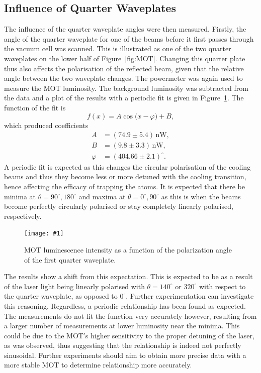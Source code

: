 \documentclass[twocolumn]{article}
\newcommand{\insertFigure}[1]{%
   \texttt{[image: \#1]}%
}
\begin{document}
\subsection{Influence of Quarter Waveplates}
The influence of the quarter waveplate angles were then measured. Firstly, the angle of the quarter waveplate for one of the beams before it first passes through the vacuum cell was scanned. This is illustrated as one of the two quarter waveplates on the lower half of Figure~\ref{fig:MOT}. Changing this quarter plate thus also affects the polarisation of the reflected beam, given that the relative angle between the two waveplate changes. The powermeter was again used to measure the MOT luminosity. The background luminosity was subtracted from the data and a plot of the results with a periodic fit is given in Figure~\ref{fig:Waveplate}. The function of the fit is
\begin{equation}
f(x) = A \cos\big(x - \varphi \big) + B, \nonumber
\end{equation}
which produced coefficients
\begin{align*}
A &=  (74.9 \pm 5.4) \, \text{nW},\\
B &=  (9.8 \pm 3.3) \, \text{nW},\\
\varphi &=  (404.66 \pm 2.1)^\circ.
\end{align*}
A periodic fit is expected as this changes the circular polarisation of the cooling beams and thus they become less or more detuned with the cooling transition, hence affecting the efficacy of trapping the atoms. It is expected that there be minima at $\theta=90^\circ, 180^\circ$ and maxima at $\theta=0^\circ, 90^\circ$ as this is when the beams become perfectly circularly polarised or stay completely linearly polarised, respectively. 
\begin{figure} [!h]
	\centering
	\insertFigure{Images/Waveplate1_w_fit.png}
	\caption{MOT luminescence intensity as a function of the polarization angle of the first quarter waveplate.}
	\label{fig:Waveplate}
\end{figure}
The results show a shift from this expectation. This is expected to be as a result of the laser light being linearly polarised with $\theta=140^\circ$ or $320^\circ$ with respect to the quarter waveplate, as opposed to $0^\circ$. Further experimentation can investigate this reasoning. Regardless, a periodic relationship has been found as expected. The measurements do not fit the function very accurately however, resulting from a larger number of measurements at lower luminosity near the minima. This could be due to the MOT's higher sensitivity to the proper detuning of the laser, as was observed, thus suggesting that the relationship is indeed not perfectly sinusoidal. Further experiments should aim to obtain more precise data with a more stable MOT to determine relationship more accurately. \\
\end{document}
